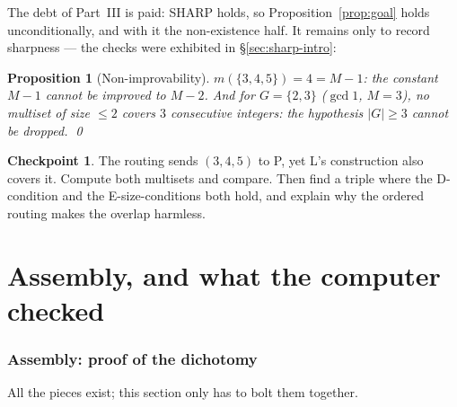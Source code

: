 \documentclass[11pt,reqno]{amsart}
\theoremstyle{plain}
\newtheorem{proposition}[theorem]{Proposition}
\theoremstyle{definition}
\newtheorem{checkpoint}[theorem]{Checkpoint}   %
\theoremstyle{remark}
\begin{document}
The debt of Part~III is paid: SHARP holds, so Proposition~\ref{prop:goal} holds
unconditionally, and with it the non-existence half. It remains only to record
sharpness --- the checks were exhibited in \S\ref{sec:sharp-intro}:

\begin{proposition}[Non-improvability]\label{prop:sharpness-friendly}
$m(\{3,4,5\}) = 4 = M - 1$: the constant $M-1$ cannot be improved to $M-2$. And
for $G = \{2,3\}$ ($\gcd 1$, $M = 3$), no multiset of size $\le 2$ covers $3$
consecutive integers: the hypothesis $|G| \ge 3$ cannot be dropped. \qed
\end{proposition}

\begin{checkpoint}
The routing sends $(3,4,5)$ to P, yet L's construction also covers it. Compute
both multisets and compare. Then find a triple where the D-condition and the
E-size-conditions both hold, and explain why the ordered routing makes the
overlap harmless.
\end{checkpoint}

\part{Assembly, and what the computer checked}

\section{Assembly: proof of the dichotomy}\label{sec:assembly-friendly}

All the pieces exist; this section only has to bolt them together.
\end{document}
